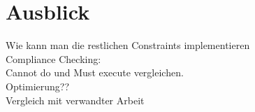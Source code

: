 
\chapter{Ausblick} %

\label{Kapitel6} %


Wie kann man die restlichen Constraints implementieren\\
Compliance Checking:\\
Cannot do und Must execute vergleichen.\\
Optimierung??\\
Vergleich mit verwandter Arbeit




